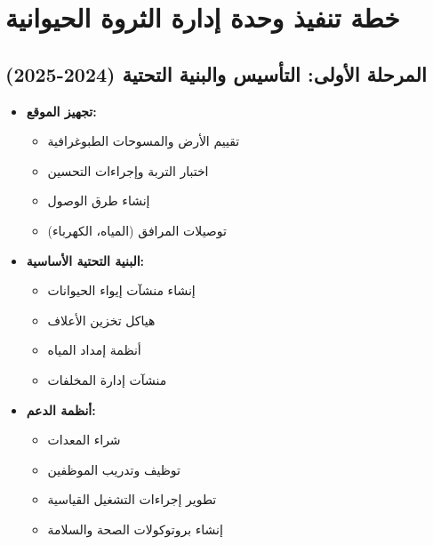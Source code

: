 \section{خطة تنفيذ وحدة إدارة الثروة الحيوانية}

\subsection{المرحلة الأولى: التأسيس والبنية التحتية (2024-2025)}
\begin{itemize}
    \item \textbf{تجهيز الموقع:}
    \begin{itemize}
        \item تقييم الأرض والمسوحات الطبوغرافية
        \item اختبار التربة وإجراءات التحسين
        \item إنشاء طرق الوصول
        \item توصيلات المرافق (المياه، الكهرباء)
    \end{itemize}
    
    \item \textbf{البنية التحتية الأساسية:}
    \begin{itemize}
        \item إنشاء منشآت إيواء الحيوانات
        \item هياكل تخزين الأعلاف
        \item أنظمة إمداد المياه
        \item منشآت إدارة المخلفات
    \end{itemize}
    
    \item \textbf{أنظمة الدعم:}
    \begin{itemize}
        \item شراء المعدات
        \item توظيف وتدريب الموظفين
        \item تطوير إجراءات التشغيل القياسية
        \item إنشاء بروتوكولات الصحة والسلامة
    \end{itemize}
\end{itemize}

